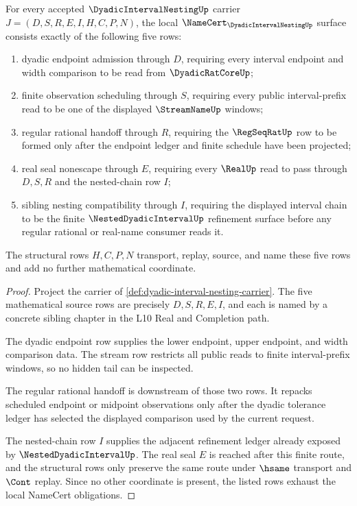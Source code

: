 \begin{theorem}\label{thm:dyadic-interval-nesting-namecert-obligations}
For every accepted $\DyadicIntervalNestingUp$ carrier $J=(D,S,R,E,I,H,C,P,N)$, the local $\NameCert_{\DyadicIntervalNestingUp}$ surface consists exactly of the following five rows:
\begin{enumerate}
\item dyadic endpoint admission through $D$, requiring every interval endpoint and width comparison to be read from $\DyadicRatCoreUp$;
\item finite observation scheduling through $S$, requiring every public interval-prefix read to be one of the displayed $\StreamNameUp$ windows;
\item regular rational handoff through $R$, requiring the $\RegSeqRatUp$ row to be formed only after the endpoint ledger and finite schedule have been projected;
\item real seal nonescape through $E$, requiring every $\RealUp$ read to pass through $D,S,R$ and the nested-chain row $I$;
\item sibling nesting compatibility through $I$, requiring the displayed interval chain to be the finite $\NestedDyadicIntervalUp$ refinement surface before any regular rational or real-name consumer reads it.
\end{enumerate}
The structural rows $H,C,P,N$ transport, replay, source, and name these five rows and add no further mathematical coordinate.
\end{theorem}
\begin{proof}
Project the carrier of \autoref{def:dyadic-interval-nesting-carrier}. The five mathematical source rows are precisely $D,S,R,E,I$, and each is named by a concrete sibling chapter in the L10 Real and Completion path.

The dyadic endpoint row supplies the lower endpoint, upper endpoint, and width comparison data. The stream row restricts all public reads to finite interval-prefix windows, so no hidden tail can be inspected.

The regular rational handoff is downstream of those two rows. It repacks scheduled endpoint or midpoint observations only after the dyadic tolerance ledger has selected the displayed comparison used by the current request.

The nested-chain row $I$ supplies the adjacent refinement ledger already exposed by $\NestedDyadicIntervalUp$. The real seal $E$ is reached after this finite route, and the structural rows only preserve the same route under $\hsame$ transport and $\Cont$ replay. Since no other coordinate is present, the listed rows exhaust the local NameCert obligations.
\end{proof}

